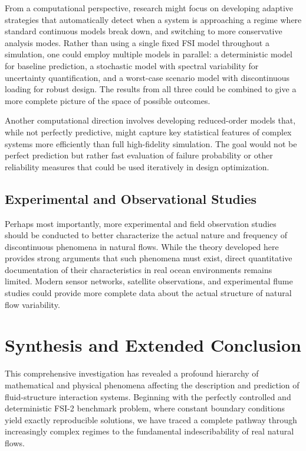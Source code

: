 ﻿\documentclass[a4paper,11pt]{article}
\theoremstyle{definition}
\begin{document}
From a computational perspective, research might focus on developing adaptive strategies that automatically detect when a system is approaching a regime where standard continuous models break down, and switching to more conservative analysis modes. Rather than using a single fixed FSI model throughout a simulation, one could employ multiple models in parallel: a deterministic model for baseline prediction, a stochastic model with spectral variability for uncertainty quantification, and a worst-case scenario model with discontinuous loading for robust design. The results from all three could be combined to give a more complete picture of the space of possible outcomes.

Another computational direction involves developing reduced-order models that, while not perfectly predictive, might capture key statistical features of complex systems more efficiently than full high-fidelity simulation. The goal would not be perfect prediction but rather fast evaluation of failure probability or other reliability measures that could be used iteratively in design optimization.

\subsection{Experimental and Observational Studies}

Perhaps most importantly, more experimental and field observation studies should be conducted to better characterize the actual nature and frequency of discontinuous phenomena in natural flows. While the theory developed here provides strong arguments that such phenomena must exist, direct quantitative documentation of their characteristics in real ocean environments remains limited. Modern sensor networks, satellite observations, and experimental flume studies could provide more complete data about the actual structure of natural flow variability.

\section{Synthesis and Extended Conclusion}

This comprehensive investigation has revealed a profound hierarchy of mathematical and physical phenomena affecting the description and prediction of fluid-structure interaction systems. Beginning with the perfectly controlled and deterministic FSI-2 benchmark problem, where constant boundary conditions yield exactly reproducible solutions, we have traced a complete pathway through increasingly complex regimes to the fundamental indescribability of real natural flows.
\end{document}

